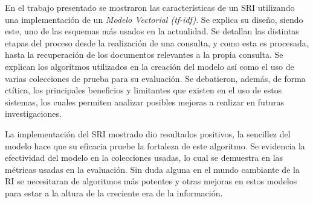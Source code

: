 En el trabajo presentado se mostraron las características de un SRI utilizando
una implementación de un \emph{Modelo Vectorial (tf-idf)}. Se explica su
diseño, siendo este, uno de las esquemas más usados en la actualidad. Se
detallan las distintas etapas del proceso desde la realización de una consulta,
y como esta es procesada, hasta la recuperación de los documentos relevantes a
la propia consulta. Se explican los algoritmos utilizados en la creación del
modelo así como el uso de varias colecciones de prueba para su evaluación.
Se debatieron, además, de forma ctítica, los principales beneficios y
limitantes que existen en el uso de estos sistemas, los cuales permiten
analizar posibles mejoras a realizar en futuras investigaciones.

La implementación del SRI mostrado dio resultados positivos, la sencillez del
modelo hace que su eficacia pruebe la fortaleza de este algoritmo. Se
evidencia la efectividad del modelo en la colecciones usadas, lo cual se
demuestra en las métricas usadas en la evaluación. Sin duda alguna en
el mundo cambiante de la RI se necesitaran de algoritmos más potentes y otras
mejoras en estos modelos para estar a la altura de la creciente era de la
información.